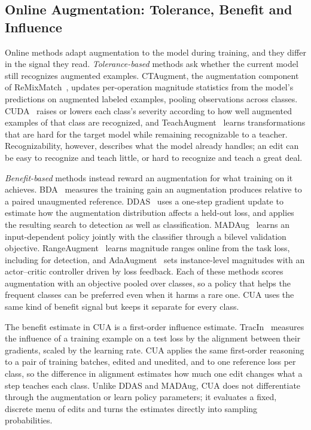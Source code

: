 \subsection{Online Augmentation: Tolerance, Benefit and Influence}

Online methods adapt augmentation to the model during training, and they differ in the signal they read. \emph{Tolerance-based} methods ask whether the current model still recognizes augmented examples. CTAugment, the augmentation component of ReMixMatch~\cite{berthelot2020}, updates per-operation magnitude statistics from the model's predictions on augmented labeled examples, pooling observations across classes. CUDA~\cite{ahn2023cuda} raises or lowers each class's severity according to how well augmented examples of that class are recognized, and TeachAugment~\cite{suzuki2022teach} learns transformations that are hard for the target model while remaining recognizable to a teacher. Recognizability, however, describes what the model already handles; an edit can be easy to recognize and teach little, or hard to recognize and teach a great deal.

\emph{Benefit-based} methods instead reward an augmentation for what training on it achieves. BDA~\cite{lu2023bda} measures the training gain an augmentation produces relative to a paired unaugmented reference. DDAS~\cite{liu2021ddas} uses a one-step gradient update to estimate how the augmentation distribution affects a held-out loss, and applies the resulting search to detection as well as classification. MADAug~\cite{hou2023madaug} learns an input-dependent policy jointly with the classifier through a bilevel validation objective. RangeAugment~\cite{mehta2022rangeaugment} learns magnitude ranges online from the task loss, including for detection, and AdaAugment~\cite{yang2025adaaugment} sets instance-level magnitudes with an actor--critic controller driven by loss feedback. Each of these methods scores augmentation with an objective pooled over classes, so a policy that helps the frequent classes can be preferred even when it harms a rare one. CUA uses the same kind of benefit signal but keeps it separate for every class.

The benefit estimate in CUA is a first-order influence estimate. TracIn~\cite{pruthi2020tracin} measures the influence of a training example on a test loss by the alignment between their gradients, scaled by the learning rate. CUA applies the same first-order reasoning to a pair of training batches, edited and unedited, and to one reference loss per class, so the difference in alignment estimates how much one edit changes what a step teaches each class. Unlike DDAS and MADAug, CUA does not differentiate through the augmentation or learn policy parameters; it evaluates a fixed, discrete menu of edits and turns the estimates directly into sampling probabilities.

